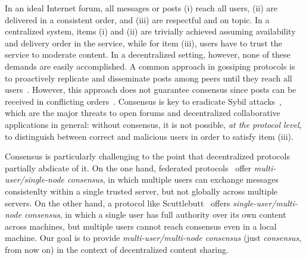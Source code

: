 \documentclass[10pt,journal,compsoc]{IEEEtran}
\begin{document}
In an ideal Internet forum, all messages or posts
(i)   reach all users,
(ii)  are delivered in a consistent order, and
(iii) are respectful and on topic.
In a centralized system, items (i) and (ii) are trivially achieved assuming
availability and delivery order in the service, while for item (iii), users
have to trust the service to moderate content.
In a decentralized setting, however, none of these demands are easily
accomplished.
A common approach in gossiping protocols is to proactively replicate and
disseminate posts among peers until they reach all
users~\cite{p2p.survey,p2p.byz}.
However, this approach does not guarantee consensus since posts can be received
in conflicting orders~\cite{p2p.intention,p2p.dvcs}.
%
Consensus is key to eradicate Sybil attacks~\cite{p2p.sybil}, which are the
major threats to open forums and decentralized collaborative applications in
general: without consensus, it is not possible, \emph{at the protocol level},
to distinguish between correct and malicious users in order to satisfy item
(iii).

Consensus is particularly challenging to the point that decentralized protocols
partially abdicate of it.
%
On the one hand, federated protocols~\cite{p2p.ecosystem} offer
\emph{multi-user/single-node consensus}, in which multiple users can exchange
messages consistenlty within a single trusted server, but not globally across
multiple servers.
%
On the other hand, a protocol like Scuttlebutt~\cite{p2p.scuttlebutt} offers
\emph{single-user/multi-node consensus}, in which a single user has full
authority over its own content across machines, but multiple users cannot reach
consensus even in a local machine.
%
Our goal is to provide \emph{multi-user/multi-node consensus} (just
\emph{consensus}, from now on) in the context of decentralized content sharing.
\end{document}
